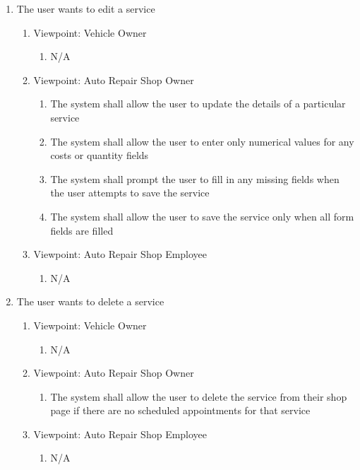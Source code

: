 \documentclass[12pt]{article}
\begin{document}
\begin{enumerate}[resume*=business_events]
	\item The user wants to edit a service
	      \begin{enumerate}[VP\arabic*.]
		      \item Viewpoint: Vehicle Owner
		            \begin{enumerate}
			            \item[] N/A
		            \end{enumerate}
		      \item Viewpoint: Auto Repair Shop Owner
		            \begin{enumerate}
			            \item The system shall allow the user to update the details of a particular service
			            \item The system shall allow the user to enter only numerical values for any costs or quantity fields
			            \item The system shall prompt the user to fill in any missing fields when the user attempts to save the
			                  service
			            \item The system shall allow the user to save the service only when all form fields are filled
		            \end{enumerate}
		      \item Viewpoint: Auto Repair Shop Employee
		            \begin{enumerate}
			            \item[] N/A
		            \end{enumerate}
	      \end{enumerate}

	\item The user wants to delete a service
	      \begin{enumerate}[VP\arabic*.]
		      \item Viewpoint: Vehicle Owner
		            \begin{enumerate}
			            \item[] N/A
		            \end{enumerate}
		      \item Viewpoint: Auto Repair Shop Owner
		            \begin{enumerate}
			            \item The system shall allow the user to delete the service from their shop page if there are no
			                  scheduled appointments for that service
		            \end{enumerate}
		      \item Viewpoint: Auto Repair Shop Employee
		            \begin{enumerate}
			            \item[] N/A
		            \end{enumerate}
	      \end{enumerate}
\end{enumerate}
\end{document}
